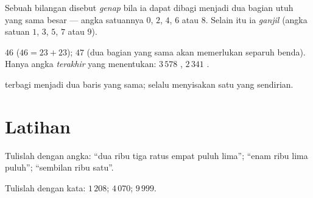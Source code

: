 \begin{definition}\label{def:g3:numbers:evenodd}
Sebuah bilangan disebut \emph{genap} bila ia
dapat dibagi menjadi dua bagian utuh yang sama besar --- angka
satuannya $0$, $2$, $4$, $6$ atau $8$. Selain itu ia
\emph{ganjil} (angka satuan $1$, $3$, $5$,
$7$ atau $9$).
\end{definition}

\begin{example}
$46$  ($46 = 23 + 23$); $47$  (dua bagian yang sama akan
memerlukan separuh benda). Hanya angka \emph{terakhir} yang
menentukan: $3\,578$ , $2\,341$ .
\end{example}

\begin{omfigure}

{\small {} terbagi menjadi dua baris yang sama;
 selalu menyisakan satu yang sendirian.}
\end{omfigure}

\section{Latihan}

\begin{exercise}[$\star$]\label{exo:g3:numbers:1}
Tulislah dengan angka: ``dua ribu tiga ratus empat puluh lima'';
``enam ribu lima puluh''; ``sembilan ribu satu''.
\end{exercise}

\begin{exercise}[$\star$]\label{exo:g3:numbers:2}
Tulislah dengan kata: $1\,208$; \quad $4\,070$; \quad $9\,999$.
\end{exercise}

